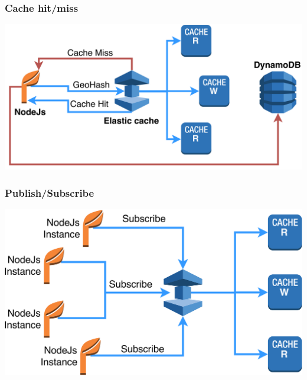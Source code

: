 \documentclass{beamer}
\begin{document}
\begin{frame}
\frametitle{Cache hit/miss}
\centerline{\includegraphics[scale=0.07]{../img/DataFetch.png}}
\end{frame}


\begin{frame}
\frametitle{Publish/Subscribe}
\centerline{\includegraphics[scale=0.07]{../img/subscribe.png}}
\end{frame}
\end{document}
